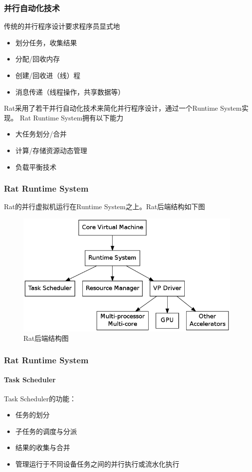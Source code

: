 \documentclass{beamer}
\begin{document}
\begin{frame}
  \frametitle{并行自动化技术}
  传统的并行程序设计要求程序员显式地
  \begin{itemize}
    \item 划分任务，收集结果
    \item 分配/回收内存
    \item 创建/回收进（线）程
    \item 消息传递（线程操作，共享数据等）
  \end{itemize}
  \pause
  Rat采用了若干并行自动化技术来简化并行程序设计，通过一个Runtime System实现。
  Rat Runtime System拥有以下能力
  \begin{itemize}
    \item 大任务划分/合并
    \item 计算/存储资源动态管理
    \item 负载平衡技术
  \end{itemize}
\end{frame}

\begin{frame}
  \frametitle{Rat Runtime System}
  Rat的并行虚拟机运行在Runtime System之上。Rat后端结构如下图
  \begin{figure}
    \caption{Rat后端结构图}
    \includegraphics[scale=0.3]{images/backend.png}
  \end{figure}
\end{frame}

\begin{frame}
  \frametitle{Rat Runtime System}
  \framesubtitle{Task Scheduler}
  Task Scheduler的功能：
  \begin{itemize}
    \item 任务的划分
    \item 子任务的调度与分派
    \item 结果的收集与合并
    \item 管理运行于不同设备任务之间的并行执行或流水化执行
  \end{itemize}
\end{frame}
\end{document}
